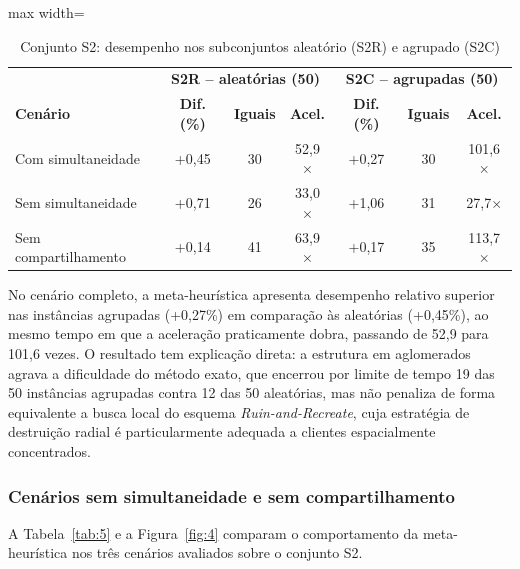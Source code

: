 \documentclass[a4paper,12pt]{article}
\begin{document}
\begin{table}[H]
    \centering
    \caption{Conjunto S2: desempenho nos subconjuntos aleatório (S2R) e agrupado (S2C)}
    \label{tab:4}
    \vspace{0.2cm}
    \footnotesize
    \setlength{\tabcolsep}{4pt}
    \begin{adjustbox}{max width=\textwidth}
    \begin{tabular}{>{\raggedright\arraybackslash}p{4.2cm} | c c c | c c c}
        \toprule
         & \multicolumn{3}{c|}{\textbf{S2R -- aleatórias (50)}} & \multicolumn{3}{c}{\textbf{S2C -- agrupadas (50)}} \\
        \textbf{Cenário} & \textbf{Dif. (\%)} & \textbf{Iguais} & \textbf{Acel.} & \textbf{Dif. (\%)} & \textbf{Iguais} & \textbf{Acel.} \\
        \midrule
        Com simultaneidade & +0,45 & 30 & 52,9$\times$ & +0,27 & 30 & 101,6$\times$ \\
        Sem simultaneidade & +0,71 & 26 & 33,0$\times$ & +1,06 & 31 & 27,7$\times$ \\
        Sem compartilhamento & +0,14 & 41 & 63,9$\times$ & +0,17 & 35 & 113,7$\times$ \\
        \bottomrule
    \end{tabular}
    \end{adjustbox}
\end{table}


No cenário completo, a meta-heurística apresenta desempenho relativo superior nas instâncias agrupadas (+0,27\%) em comparação às aleatórias (+0,45\%), ao mesmo tempo em que a aceleração praticamente dobra, passando de 52,9 para 101,6 vezes. O resultado tem explicação direta: a estrutura em aglomerados agrava a dificuldade do método exato, que encerrou por limite de tempo 19 das 50 instâncias agrupadas contra 12 das 50 aleatórias, mas não penaliza de forma equivalente a busca local do esquema \textit{Ruin-and-Recreate}, cuja estratégia de destruição radial é particularmente adequada a clientes espacialmente concentrados.

\subsubsection{Cenários sem simultaneidade e sem compartilhamento}
A Tabela~\ref{tab:5} e a Figura~\ref{fig:4} comparam o comportamento da meta-heurística nos três cenários avaliados sobre o conjunto S2.
\end{document}
